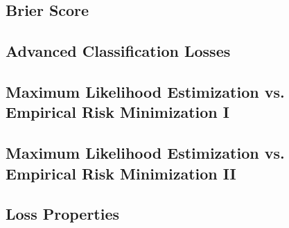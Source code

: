 \subsection{Brier Score}


\subsection{Advanced Classification Losses}


\subsection{Maximum Likelihood Estimization vs. Empirical Risk Minimization I}


\subsection{Maximum Likelihood Estimization vs. Empirical Risk Minimization II}


\subsection{Loss Properties}


